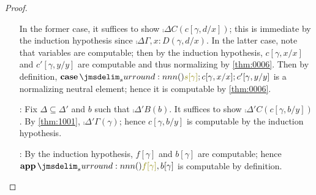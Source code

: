\documentclass[a4paper]{article}
\begin{document}
\begin{proof}
\begin{itemize}
    In the former case, it suffices to show $\comp{\Delta}{C}(c[\gamma,d/x])$; this is immediate by the induction hypothesis since $\comp{\Delta}{\Gamma,x : D}(\gamma, d/x)$.
    In the latter case, note that variables are computable; then by the induction hypothesis, $c[\gamma,x/x]$ and $c'[\gamma,y/y]$ are computable and thus normalizing by \cref{thm:0006}.
    Then by definition, $\tmCase{s[\gamma]}{c[\gamma,x/x]}{c'[\gamma,y/y]}$ is a normalizing neutral element; hence it is computable by \cref{thm:0006}.
  \item[\rFunI:] Fix $\Delta \subseteq \Delta'$ and $b$ such that $\comp{\Delta'}{B}(b)$.
    It suffices to show $\comp{\Delta'}{C}(c[\gamma,b/y])$.
    By \cref{thm:1001}, $\comp{\Delta'}{\Gamma}(\gamma)$; hence $c[\gamma,b/y]$ is computable by the induction hypothesis.
  \item[\rFunE:] By the induction hypothesis, $f[\gamma]$ and $b[\gamma]$ are computable; hence $\tmApp{f[\gamma]}{b[\gamma]}$ is computable by definition.
  \end{itemize}
\end{proof}



\end{document}
